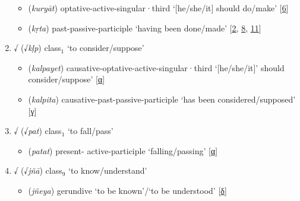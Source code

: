\begin{enumerate}
        \begin{itemize}
        \item {} (\textit{kuryāt}) \acrshort{optative}-\acrshort{active}-\acrshort{singular}·\acrshort{third} `[he/she/it] should do/make' [\hyperlink{Spass6}{6}]
        \item {} (\textit{kṛta}) \acrshort{past}-\acrshort{passive}-\acrshort{participle} `having been done/made' [\hyperlink{Spass2}{2}, \hyperlink{Spass8}{8}, \hyperlink{Spass11}{11}]
        \end{itemize}
\item √ (√\textit{kḷp}) \acrshort{class}$_\text{1}$  `to consider/suppose'
        \begin{itemize}
        \item {} (\textit{kalpayet}) \acrshort{causative}-\acrshort{optative}-\acrshort{active}-\acrshort{singular}·\acrshort{third} `[he/she/it]' should consider/suppose' [\hyperlink{SpassA}{α}]
        \item {} (\textit{kalpita})  \acrshort{causative}-\acrshort{past}-\acrshort{passive}-\acrshort{participle} `has been considered/supposed' [\hyperlink{SpassC}{γ}]
        \end{itemize}        
\item √ (√\textit{pat}) \acrshort{class}$_\text{1}$ `to fall/pass'
    \begin{itemize}
        \item {} (\textit{patat}) \acrshort{present}-
        \acrshort{active}-\acrshort{participle} `falling/passing' [\hyperlink{SpassA}{α}]
    \end{itemize}
\item √{} (√\textit{jñā}) \acrshort{class}$_\text{9}$  `to know/understand'
    \begin{itemize}
    \item {} (\textit{jñeya}) \acrshort{gerundive} `to be known'/`to be understood' [\hyperlink{SpassD}{δ}]
    \end{itemize}
\end{enumerate}